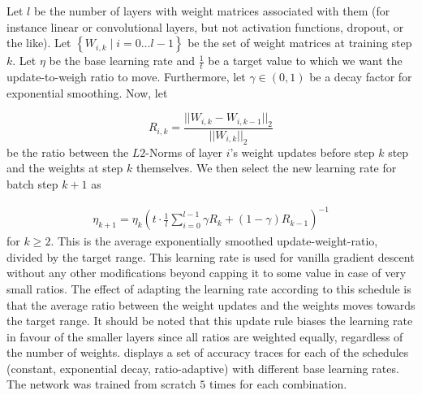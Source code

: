 Let $l$ be the number of layers with weight matrices associated with them (for
instance linear or convolutional layers, but not activation functions, dropout,
or the like). Let $\left\{W_{i,k} \mid i = 0 \ldots l - 1\right\}$ be the set of weight
matrices at training step $k$.  Let $\eta$ be the base learning rate and
$\frac{1}{t}$ be a target value to which we want the update-to-weigh ratio to
move. Furthermore, let $\gamma \in (0, 1)$ be a decay factor for exponential
smoothing.  Now, let

\begin{equation}
    R_{i,k} = \frac{||W_{i,k} - W_{i,k-1}||_2}{||W_{i,k}||_2}
\end{equation}
be the ratio between the $L2$-Norms of layer $i$'s weight updates before step $k$ step
and the weights at step $k$ themselves.  We then select the new learning rate
for batch step $k+1$ as

\begin{align}
    \eta_{k+1}   = \eta_{k}
                   \left(
                   t \cdot \frac{1}{l}
                   \sum_{i=0}^{l-1} \gamma R_k + (1 - \gamma) R_{k-1}
                   \right)^{-1}
\end{align}
for $k \ge 2$.  This is the average exponentially smoothed update-weight-ratio,
divided by the target range. This learning rate is used for vanilla gradient
descent without any other modifications beyond capping it to some value in case
of very small ratios. The effect of adapting the learning rate according to this
schedule is that the average ratio between the weight updates and the weights
moves towards the target range.  It should be noted that this update rule biases
the learning rate in favour of the smaller layers since all ratios are weighted
equally, regardless of the number of weights.
 displays a set of accuracy traces for each of the
schedules (constant, exponential decay, ratio-adaptive) with different base
learning rates. The network was trained from scratch $5$ times for each combination.

